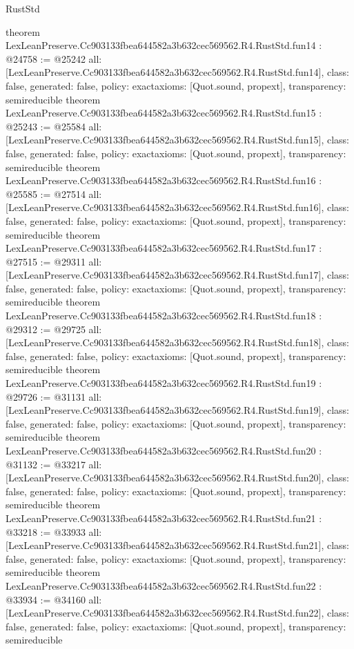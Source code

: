 \begin{lexlean}{RustStd}
\begin{coremodule}
{}
theorem LexLeanPreserve.Cc903133fbea644582a3b632cec569562.R4.RustStd.fun14 : @24758 := @25242 {
  all: [LexLeanPreserve.Cc903133fbea644582a3b632cec569562.R4.RustStd.fun14],
  class: false,
  generated: false,
  policy: exact{axioms: [Quot.sound, propext]},
  transparency: semireducible
}
theorem LexLeanPreserve.Cc903133fbea644582a3b632cec569562.R4.RustStd.fun15 : @25243 := @25584 {
  all: [LexLeanPreserve.Cc903133fbea644582a3b632cec569562.R4.RustStd.fun15],
  class: false,
  generated: false,
  policy: exact{axioms: [Quot.sound, propext]},
  transparency: semireducible
}
theorem LexLeanPreserve.Cc903133fbea644582a3b632cec569562.R4.RustStd.fun16 : @25585 := @27514 {
  all: [LexLeanPreserve.Cc903133fbea644582a3b632cec569562.R4.RustStd.fun16],
  class: false,
  generated: false,
  policy: exact{axioms: [Quot.sound, propext]},
  transparency: semireducible
}
theorem LexLeanPreserve.Cc903133fbea644582a3b632cec569562.R4.RustStd.fun17 : @27515 := @29311 {
  all: [LexLeanPreserve.Cc903133fbea644582a3b632cec569562.R4.RustStd.fun17],
  class: false,
  generated: false,
  policy: exact{axioms: [Quot.sound, propext]},
  transparency: semireducible
}
theorem LexLeanPreserve.Cc903133fbea644582a3b632cec569562.R4.RustStd.fun18 : @29312 := @29725 {
  all: [LexLeanPreserve.Cc903133fbea644582a3b632cec569562.R4.RustStd.fun18],
  class: false,
  generated: false,
  policy: exact{axioms: [Quot.sound, propext]},
  transparency: semireducible
}
theorem LexLeanPreserve.Cc903133fbea644582a3b632cec569562.R4.RustStd.fun19 : @29726 := @31131 {
  all: [LexLeanPreserve.Cc903133fbea644582a3b632cec569562.R4.RustStd.fun19],
  class: false,
  generated: false,
  policy: exact{axioms: [Quot.sound, propext]},
  transparency: semireducible
}
theorem LexLeanPreserve.Cc903133fbea644582a3b632cec569562.R4.RustStd.fun20 : @31132 := @33217 {
  all: [LexLeanPreserve.Cc903133fbea644582a3b632cec569562.R4.RustStd.fun20],
  class: false,
  generated: false,
  policy: exact{axioms: [Quot.sound, propext]},
  transparency: semireducible
}
theorem LexLeanPreserve.Cc903133fbea644582a3b632cec569562.R4.RustStd.fun21 : @33218 := @33933 {
  all: [LexLeanPreserve.Cc903133fbea644582a3b632cec569562.R4.RustStd.fun21],
  class: false,
  generated: false,
  policy: exact{axioms: [Quot.sound, propext]},
  transparency: semireducible
}
theorem LexLeanPreserve.Cc903133fbea644582a3b632cec569562.R4.RustStd.fun22 : @33934 := @34160 {
  all: [LexLeanPreserve.Cc903133fbea644582a3b632cec569562.R4.RustStd.fun22],
  class: false,
  generated: false,
  policy: exact{axioms: [Quot.sound, propext]},
  transparency: semireducible
}
\end{coremodule}
\end{lexlean}
